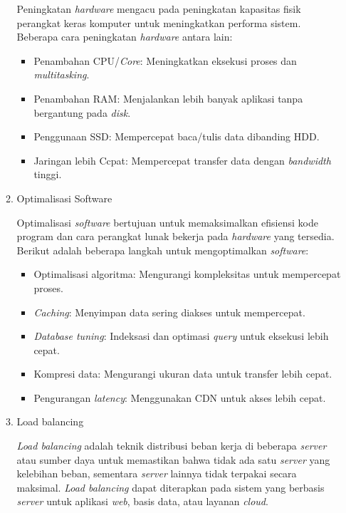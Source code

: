 \documentclass[12pt]{article}
\begin{document}
\begin{enumerate}
\begin{enumerate}
        \par Peningkatan \textit{hardware} mengacu pada peningkatan kapasitas fisik perangkat keras komputer untuk meningkatkan performa sistem. Beberapa cara peningkatan \textit{hardware} antara lain:
        \begin{itemize}
            \item Penambahan CPU/\textit{Core}: Meningkatkan eksekusi proses dan \textit{multitasking}.
            \item Penambahan RAM: Menjalankan lebih banyak aplikasi tanpa bergantung pada \textit{disk}.
            \item Penggunaan SSD: Mempercepat baca/tulis data dibanding HDD.
            \item Jaringan lebih Ccpat: Mempercepat transfer data dengan \textit{bandwidth} tinggi.
        \end{itemize}
        \item Optimalisasi Software
        \par Optimalisasi \textit{software} bertujuan untuk memaksimalkan efisiensi kode program dan cara perangkat lunak bekerja pada \textit{hardware} yang tersedia. Berikut adalah beberapa langkah untuk mengoptimalkan \textit{software}:
        \begin{itemize}
            \item Optimalisasi algoritma: Mengurangi kompleksitas untuk mempercepat proses.
            \item \textit{Caching}: Menyimpan data sering diakses untuk mempercepat.
            \item \textit{Database tuning}: Indeksasi dan optimasi \textit{query} untuk eksekusi lebih cepat.
            \item Kompresi data: Mengurangi ukuran data untuk transfer lebih cepat.
            \item Pengurangan \textit{latency}: Menggunakan CDN untuk akses lebih cepat.
        \end{itemize}
        \item Load balancing
        \par \textit{Load balancing} adalah teknik distribusi beban kerja di beberapa \textit{server} atau sumber daya untuk memastikan bahwa tidak ada satu \textit{server} yang kelebihan beban, sementara \textit{server} lainnya tidak terpakai secara maksimal. \textit{Load balancing} dapat diterapkan pada sistem yang berbasis \textit{server} untuk aplikasi \textit{web}, basis data, atau layanan \textit{cloud}.
        \begin{figure}[h]

\end{figure}
\end{enumerate}
\end{enumerate}
\end{document}
